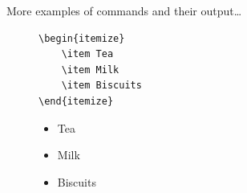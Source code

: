 \documentclass[aspectratio=169]{beamer}
\begin{document}
\begin{frame}[fragile]{More examples of commands and their output\ldots}

    \begin{figure}[h]
        \centering
        \begin{minipage}{0.5\textwidth}
            \begin{lstlisting}[showlines=true]
\begin{itemize}
    \item Tea
    \item Milk
    \item Biscuits
\end{itemize}
            \end{lstlisting}
        \end{minipage}
        \begin{minipage}{0.4\textwidth}
            \begin{itemize}
                \item Tea
                \item Milk
                \item Biscuits
            \end{itemize}
        \end{minipage}
    \end{figure}



\end{frame}
\end{document}
